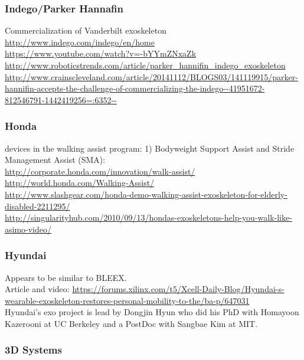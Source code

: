 \subsubsection{Indego/Parker Hannafin}

\noindent
Commercialization of Vanderbilt exoskeleton\\
\url{http://www.indego.com/indego/en/home}\\
\url{https://www.youtube.com/watch?v=-bYYmZNxaZk}\\
\url{http://www.roboticstrends.com/article/parker_hannifin_indego_exoskeleton}\\
\url{http://www.crainscleveland.com/article/20141112/BLOGS03/141119915/parker-hannifin-accepts-the-challenge-of-commercializing-the-indego--41951672-812546791-1442419256=:6352--}\\

\subsubsection{Honda}

 devices in the walking assist program: 1) Bodyweight Support Assist and
Stride Management Assist (SMA):\\
\url{http://corporate.honda.com/innovation/walk-assist/}\\
\url{http://world.honda.com/Walking-Assist/}\\
\url{http://www.slashgear.com/honda-demo-walking-assist-exoskeleton-for-elderly-disabled-2211295/}\\
\url{http://singularityhub.com/2010/09/13/hondas-exoskeletons-help-you-walk-like-asimo-video/}\\

\subsubsection{Hyundai}

\noindent
Appears to be similar to BLEEX.\\
Article and video: \url{https://forums.xilinx.com/t5/Xcell-Daily-Blog/Hyundai-s-wearable-exoskeleton-restores-personal-mobility-to-the/ba-p/647031}\\
Hyundai's exo project is lead by Dongjin Hyun who did his
PhD with Homayoon Kazerooni at UC Berkeley and a PostDoc with Sangbae
Kim at MIT.

\subsubsection{3D Systems}

